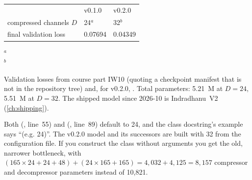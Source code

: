 \begin{drift}
\begin{tabular}{lll}
& v0.1.0 & v0.2.0\\
compressed channels $D$ & 24$^{a}$ & 32$^{b}$\\
final validation loss & 0.07694 & 0.04349\\
\end{tabular}

$^{a}$\\
$^{b}$

Validation losses from course part IW10 (quoting a checkpoint manifest that is not in the repository
tree) and, for v0.2.0, . Total
parameters: 5.21~M at $D=24$, 5.51~M at $D=32$.
The shipped model since 2026-10 is Indradhanu~V2 (\cref{ch:shipping}).
\end{drift}

\begin{sourcenote}
Both 
(, line~55) and
 (, line~89) default
 to 24, and the class docstring's example says ``(e.g. 24)''. The v0.2.0
model and its successors are built with 32 from the configuration file. If you construct the class
without arguments you get the old, narrower bottleneck, with
$(165\times24 + 24 + 48) + (24\times165 + 165) = 4{,}032 + 4{,}125 = 8{,}157$ compressor and
decompressor parameters instead of 10{,}821\tagC.
\end{sourcenote}

